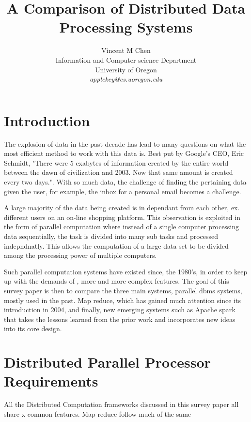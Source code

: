 \documentclass[10pt,twocolumn]{IEEEtran11}
\begin{document}


\title{\Large \bf A Comparison of Distributed Data Processing Systems}
\author{
Vincent M Chen\\
Information and Computer science Department\\
University of Oregon\\
{\em applekey@cs.uoregon.edu}
}
\maketitle

\section{Introduction}
The explosion of data in the past decade has lead to many questions on what the most efficient method to work with this data is. Best put by Google's CEO, Eric Schmidt, "There were 5 exabytes of information created by the entire world between the dawn of civilization and 2003. Now that same amount is created every two days.".  With so much data, the challenge of finding the pertaining data given the user, for example, the inbox for a personal email becomes a challenge.
\par
A large majority of the data being created is in dependant from each other, ex. different users on an on-line shopping platform.  This observation is exploited in the form of parallel computation where instead of a single computer processing data sequentially, the task is divided into many sub tasks and processed indepndnatly.  This allows the computation of a large data set to be divided among the processing power of multiple computers.
\par
Such parallel computation systems have existed since, the 1980's, in order to keep up with the demands of , more and more complex features.  The goal of this survey paper is then to compare the three main systems, parallel dbms systems, mostly used in the past.  Map reduce, which has gained much attention since its introduction in 2004, and finally, new emerging systems such as Apache spark that takes the lessons learned from the prior work and incorporates new ideas into its core design.


\section{Distributed Parallel Processor Requirements}

    All the Distributed Computation frameworks discussed in this survey paper all share x common features.  Map reduce follow much of the same
    
\end{document}
